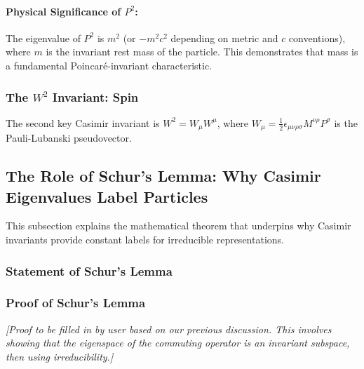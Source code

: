 \documentclass{amsart}
\theoremstyle{definition}
\theoremstyle{remark}
\begin{document}
\paragraph{Physical Significance of $P^2$:}
The eigenvalue of $P^2$ is $m^2$ (or $-m^2 c^2$ depending on metric and $c$ conventions), where $m$ is the invariant rest mass of the particle.
This demonstrates that mass is a fundamental Poincaré-invariant characteristic.

\subsubsection{The $W^2$ Invariant: Spin}
\label{subsubsec:w_squared_invariant}
The second key Casimir invariant is $W^2 = W_\mu W^\mu$, where $W_\mu = \frac{1}{2} \epsilon_{\mu\nu\rho\sigma} M^{\nu\rho} P^\sigma$ is the Pauli-Lubanski pseudovector.

\subsection{The Role of Schur's Lemma: Why Casimir Eigenvalues Label Particles}
\label{subsec:schurs_lemma_role}
This subsection explains the mathematical theorem that underpins why Casimir invariants provide constant labels for irreducible representations.

\subsubsection{Statement of Schur's Lemma}
\label{subsubsec:schurs_lemma_statement}

\subsubsection{Proof of Schur's Lemma}
\label{subsubsec:schurs_lemma_proof}
\textit{[Proof to be filled in by user based on our previous discussion. This involves showing that the eigenspace of the commuting operator is an invariant subspace, then using irreducibility.]}
\end{document}
